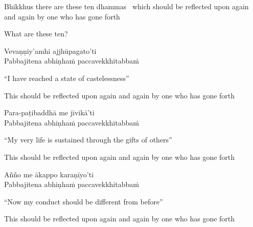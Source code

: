 \begin{english-hang-verses}
  Bhikkhus there are these ten dhammas\ifdigitalversion\makeatletter\hyperlink{endnote99-appendix}\makeatother\fi
 \breathmark\ which should be reflected upon again and again by one who has gone forth\\
\end{english-hang-verses}

\begin{english}
  What are these ten?
\end{english}

Vevaṇṇiy'amhi ajjhūpagato'ti\\
Pabbajitena abhiṇhaṁ paccavekkhitabbaṁ

\begin{english-verses}
  ``I have reached a state of castelessness''\ifdigitalversion\makeatletter\hyperlink{endnote100-appendix}\makeatother\fi
  \begin{english-hang-together-verses}
    This should be reflected upon again and again by one who has gone forth
  \end{english-hang-together-verses}
\end{english-verses}

Para-paṭibaddhā me jīvikā'ti\\
Pabbajitena abhiṇhaṁ paccavekkhitabbaṁ

\begin{english-verses}
  ``My very life is sustained through the gifts of others''
  \begin{english-hang-together-verses}
    This should be reflected upon again and again by one who has gone forth
  \end{english-hang-together-verses}
\end{english-verses}

\ifninebythirteenversion\clearpage\fi

Añño me ākappo karaṇīyo'ti\\
Pabbajitena abhiṇhaṁ paccavekkhitabbaṁ

\ifafiveversion\clearpage\fi
\ifbfiveversion\clearpage\fi

\begin{english-verses}
  ``Now my conduct should be different from before''\ifdigitalversion\makeatletter\hyperlink{endnote101-appendix}\makeatother\fi
  \begin{english-hang-together-verses}
    This should be reflected upon again and again by one who has gone forth
  \end{english-hang-together-verses}
\end{english-verses}

